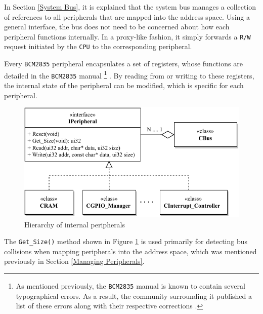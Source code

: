 \documentclass[english, ing, kiv, he, iso690numb, pdf]{fasthesis}
\begin{document}
	In Section \ref{System Bus}, it is explained that the system bus manages a collection of references to all peripherals that are mapped into the address space. Using a general interface, the bus does not need to be concerned about how each peripheral functions internally. In a proxy-like fashion, it simply forwards a \texttt{R/W} request initiated by the \texttt{CPU} to the corresponding peripheral. 
	
	Every \texttt{BCM2835} peripheral encapsulates a set of registers, whose functions are detailed in the \texttt{BCM2835} manual \footnote{As mentioned previously, the \texttt{BCM2835} manual is known to contain several typographical errors. As a result, the community surrounding it published a list of these errors along with their respective corrections \cite{BCM2835_datasheet_errata}.} \cite{BCM2835}. By reading from or writing to these registers, the internal state of the peripheral can be modified, which is specific for each peripheral.
	
	\begin{figure}[ht]
		\centering
		\includegraphics[width=.82\textwidth]{img/diagrams/peripheral_interface.pdf}
		\caption{Hierarchy of internal peripherals}
		\label{Hierarchy of internal peripherals}
	\end{figure}
	
	The \texttt{Get\_Size()} method shown in Figure \ref{Hierarchy of internal peripherals} is used primarily for detecting bus collisions when mapping peripherals into the address space, which was mentioned previously in Section \ref{Managing Peripherals}.
	
\end{document}
